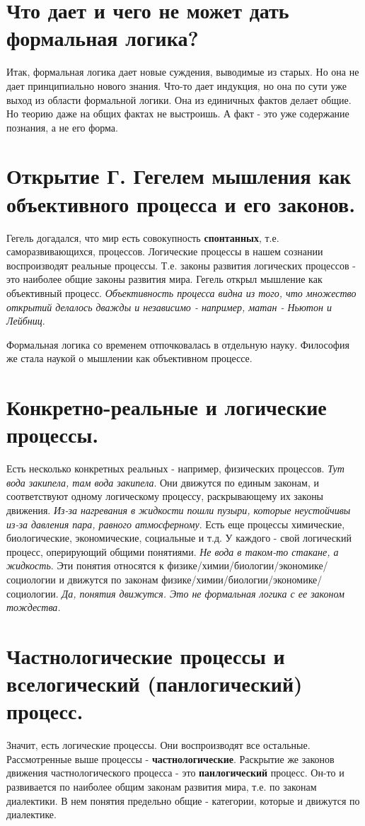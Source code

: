\section{ Что дает и чего не может дать формальная логика?}
Итак, формальная логика дает новые суждения, выводимые из старых. Но она не дает принципиально нового знания. Что-то дает индукция, но она по сути уже выход из области формальной логики. Она из единичных фактов делает общие. Но теорию даже на общих фактах не выстроишь. А факт - это уже содержание познания, а не его форма.

\section{ Открытие Г. Гегелем мышления как объективного процесса и его законов.}
Гегель догадался, что мир есть совокупность \textbf{спонтанных}, т.е. саморазвивающихся, процессов.
Логические процессы в нашем сознании воспроизводят реальные процессы. Т.е. законы развития логических процессов - это наиболее общие законы развития мира.
Гегель открыл мышление как  объективный процесс. \textit{Объективность процесса видна из того, что множество открытий делалось дважды и независимо - например, матан - Ньютон и Лейбниц}. 

Формальная логика со временем отпочковалась в отдельную науку. Философия же стала наукой о мышлении как объективном процессе. 

\section{ Конкретно-реальные и логические процессы.}
Есть несколько конкретных реальных - например, физических процессов. \textit{Тут вода закипела, там вода закипела}. Они движутся по единым законам, и соответствуют одному логическому процессу, раскрывающему их законы движения. \textit{Из-за нагревания в жидкости пошли пузыри, которые неустойчивы из-за давления пара, равного атмосферному}. Есть еще процессы химические, биологические, экономические, социальные и т.д. У каждого - свой логический процесс, оперирующий общими понятиями. \textit{Не вода в таком-то стакане, а жидкость}. Эти понятия относятся к физике/химии/биологии/экономике/социологии и движутся по законам физике/химии/биологии/экономике/социологии.
\textit{Да, понятия движутся. Это не формальная логика с ее законом тождества.}
 
\section{ Частнологические процессы и вселогический (панлогический) процесс.}
Значит, есть логические процессы. Они воспроизводят все остальные.
Рассмотренные выше процессы - \textbf{частнологические}. Раскрытие же законов движения частнологического процесса - это \textbf{панлогический} процесс. Он-то и развивается по наиболее общим законам развития мира, т.е. по законам диалектики. В нем понятия предельно общие - категории, которые и движутся по диалектике.

